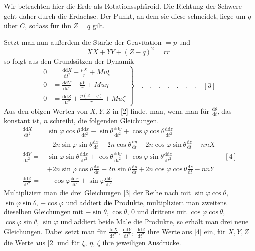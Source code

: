 Wir betrachten hier die Erde als Rotationssphäroid. Die Richtung der Schwere geht daher durch die Erdachse. Der Punkt, an dem sie diese schneidet, liege um $q$ über $C$, sodass für ihn $Z=q$ gilt.

Setzt man nun außerdem die Stärke der Gravitation $=p$ und
\[
XX+YY+(Z-q)^2=rr
\]
so folgt aus den Grundsätzen der Dynamik
\[
\left.\begin{aligned}
0&=\frac{\mathrm{dd}X}{\mathrm{d}t^2}+\frac{pX}{r}+Mu\xi\\
0&=\frac{\mathrm{dd}Y}{\mathrm{d}t^2}+\frac{pY}{r}+Mu\eta\\
0&=\frac{\mathrm{dd}Z}{\mathrm{d}t^2}+\frac{p(Z-q)}{r}+Mu\zeta
\end{aligned}\right\}\quad.\quad.\quad.\quad.\quad.\quad.\quad.\quad[3]
\]
Aus den obigen Werten von $X,Y,Z$ in [2] findet man, wenn man für $\tfrac{\mathrm{d}\theta}{\mathrm{d}t}$, das konstant ist, $n$ schreibt, die folgenden Gleichungen.
\[
\begin{aligned}
\frac{\mathrm{dd}X}{\mathrm{d}t^2}={}&\sin\varphi\cos\theta\frac{\mathrm{dd}x}{\mathrm{d}t^2}-\sin\theta\frac{\mathrm{dd}y}{\mathrm{d}t^2}+\cos\varphi\cos\theta\frac{\mathrm{dd}z}{\mathrm{d}t^2}\\
&-2n\sin\varphi\sin\theta\frac{\mathrm{d}x}{\mathrm{d}t}-2n\cos\theta\frac{\mathrm{d}y}{\mathrm{d}t}-2n\cos\varphi\sin\theta\frac{\mathrm{d}z}{\mathrm{d}t}-nnX\\[5pt]
\frac{\mathrm{dd}Y}{\mathrm{d}t^2}={}&\sin\varphi\sin\theta\frac{\mathrm{dd}x}{\mathrm{d}t^2}+\cos\theta\frac{\mathrm{dd}y}{\mathrm{d}t^2}+\cos\varphi\sin\theta\frac{\mathrm{dd}z}{\mathrm{d}t^2}\\
&+2n\sin\varphi\cos\theta\frac{\mathrm{d}x}{\mathrm{d}t}-2n\sin\theta\frac{\mathrm{d}y}{\mathrm{d}t}+2n\cos\varphi\cos\theta\frac{\mathrm{d}z}{\mathrm{d}t}-nnY\\[5pt]
\frac{\mathrm{dd}Z}{\mathrm{d}t^2}={}&-\cos\varphi\frac{\mathrm{dd}x}{\mathrm{d}t^2}+\sin\varphi\frac{\mathrm{dd}z}{\mathrm{d}t^2}
\end{aligned}\quad[4]
\]
Multipliziert man die drei Gleichungen [3] der Reihe nach mit $\sin\varphi\cos\theta$, $\sin\varphi\sin\theta$, $-\cos\varphi$ und addiert die Produkte, multipliziert man zweitens dieselben Gleichungen mit $-\sin\theta$, $\cos\theta$, $0$ und drittens mit $\cos\varphi\cos\theta$, $\cos\varphi\sin\theta$, $\sin\varphi$ und addiert beide Male die Produkte, so erhält man drei neue Gleichungen. Dabei setzt man für $\tfrac{\mathrm{dd}X}{\mathrm{d}t^2}$, $\tfrac{\mathrm{dd}Y}{\mathrm{d}t^2}$, $\tfrac{\mathrm{dd}Z}{\mathrm{d}t^2}$ ihre Werte aus [4] ein, für $X,Y,Z$ die Werte aus [2] und für $\xi$, $\eta$, $\zeta$ ihre jeweiligen Ausdrücke.

